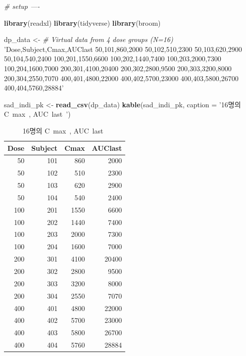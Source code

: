 \documentclass[12pt,]{krantz}
\newenvironment{Shaded}{\begin{snugshade}}{\end{snugshade}}
\newcommand{\KeywordTok}[1]{\textcolor[rgb]{0.13,0.29,0.53}{\textbf{#1}}}
\newcommand{\DataTypeTok}[1]{\textcolor[rgb]{0.13,0.29,0.53}{#1}}
\newcommand{\StringTok}[1]{\textcolor[rgb]{0.31,0.60,0.02}{#1}}
\newcommand{\CommentTok}[1]{\textcolor[rgb]{0.56,0.35,0.01}{\textit{#1}}}
\newcommand{\NormalTok}[1]{#1}
\theoremstyle{definition}
\theoremstyle{definition}
\theoremstyle{definition}
\theoremstyle{remark}
\begin{document}
\begin{Shaded}
\begin{Highlighting}[]
\CommentTok{# setup ----}

\KeywordTok{library}\NormalTok{(readxl)}
\KeywordTok{library}\NormalTok{(tidyverse)}
\KeywordTok{library}\NormalTok{(broom)}

\NormalTok{dp_data <-}\StringTok{ }\CommentTok{# Virtual data from 4 dose groups (N=16)}
\StringTok{'Dose,Subject,Cmax,AUClast}
\StringTok{50,101,860,2000}
\StringTok{50,102,510,2300}
\StringTok{50,103,620,2900}
\StringTok{50,104,540,2400}
\StringTok{100,201,1550,6600}
\StringTok{100,202,1440,7400}
\StringTok{100,203,2000,7300}
\StringTok{100,204,1600,7000}
\StringTok{200,301,4100,20400}
\StringTok{200,302,2800,9500}
\StringTok{200,303,3200,8000}
\StringTok{200,304,2550,7070}
\StringTok{400,401,4800,22000}
\StringTok{400,402,5700,23000}
\StringTok{400,403,5800,26700}
\StringTok{400,404,5760,28884'}

\NormalTok{sad_indi_pk <-}\StringTok{ }\KeywordTok{read_csv}\NormalTok{(dp_data)}
\KeywordTok{kable}\NormalTok{(sad_indi_pk, }\DataTypeTok{caption =} \StringTok{'16명의 C~max~, AUC~last~'}\NormalTok{)}
\end{Highlighting}
\end{Shaded}

\begin{table}

\caption{\label{tab:sad-pk}16명의 C~max~, AUC~last~}
\centering
\begin{tabular}[t]{r|r|r|r}
\hline
Dose & Subject & Cmax & AUClast\\
\hline
50 & 101 & 860 & 2000\\
\hline
50 & 102 & 510 & 2300\\
\hline
50 & 103 & 620 & 2900\\
\hline
50 & 104 & 540 & 2400\\
\hline
100 & 201 & 1550 & 6600\\
\hline
100 & 202 & 1440 & 7400\\
\hline
100 & 203 & 2000 & 7300\\
\hline
100 & 204 & 1600 & 7000\\
\hline
200 & 301 & 4100 & 20400\\
\hline
200 & 302 & 2800 & 9500\\
\hline
200 & 303 & 3200 & 8000\\
\hline
200 & 304 & 2550 & 7070\\
\hline
400 & 401 & 4800 & 22000\\
\hline
400 & 402 & 5700 & 23000\\
\hline
400 & 403 & 5800 & 26700\\
\hline
400 & 404 & 5760 & 28884\\
\hline
\end{tabular}
\end{table}
\end{document}

